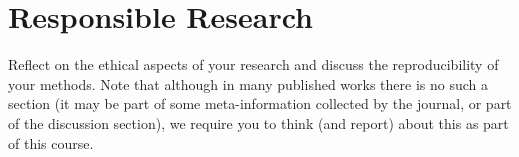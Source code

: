 \section{Responsible Research}
\label{sec:responsible}
Reflect on the ethical aspects of your research and discuss the reproducibility of your methods.
Note that although in many published works there is no such a section (it may be part of some meta-information collected by the journal, or part of the discussion section), we require you to think (and report) about this as part of this course.